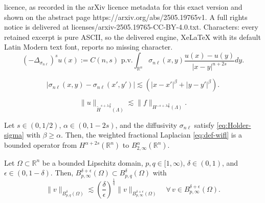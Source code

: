 \documentclass[10pt,a4paper]{amsart}
\def\R{{\mathbb R}}
\def\rn{{{\mathbb R}^n}}
\newcommand{\domain}{\Lambda}
\newcommand{\snl}{{\sigma_{n\ell}}}
\begin{document}
licence, as recorded in the arXiv licence metadata for this exact version and shown on the abstract page https://arxiv.org/abs/2505.19765v1. A full rights notice is delivered at licenses/arxiv-2505.19765-CC-BY-4.0.txt. Characters: every retained excerpt is pure ASCII, so the delivered engine, XeLaTeX with its default Latin Modern text font, reports no missing character.
\begin{equation}\label{eq:def-wifl}
(-\Delta_\snl)^s u (x) := C(n,s) \mbox{ p.v.}\int_{\rn} \snl(x,y)\frac{u(x)-u(y)}{|x-y|^{n+2s}} dy.
\end{equation}

\begin{equation} \label{eq:Holder-sigma}
| \snl(x,y) - \snl(x',y') | \lesssim \left(|x-x'|^\beta + |y-y'|^\beta \right).
\end{equation}

\begin{equation}\label{eq:sob-regularity-intermediate}
  \| u \|_{\widetilde{H}^{s+ \lambda \frac\beta{2}}(\domain)} \lesssim  \| f \|_{H^{-s+\lambda \frac\beta{2}}(\domain)}.
\end{equation}

\begin{lemma}\label{lemma:mapping-Laplacian}
Let $s \in (0,1/2)$, $\alpha \in (0, 1-2s)$, and the diffusivity $\snl$ satisfy \eqref{eq:Holder-sigma} with $\beta \ge \alpha$. Then, the weighted fractional Laplacian \eqref{eq:def-wifl} is a bounded operator from $H^{\alpha+2s} (\R^n)$ to $B^{\alpha}_{2,\infty}(\R^n).$
\end{lemma}

\begin{proposition}
Let $\Omega \subset \R^n$ be a bounded Lipschitz domain, $p,q \in [1,\infty)$, $\delta\in (0,1)$, and $\epsilon \in (0,1-\delta)$. Then, $B^{\delta+\epsilon}_{p,\infty}(\Omega) \subset B^{\delta}_{p,q} (\Omega)$ with 
\begin{equation}\label{eq:Besov-Sobolev-emb}
\|v\|_{ B^{\delta}_{p,q}(\Omega)} \lesssim 
\left( \frac{\delta}{\epsilon} \right)^{\frac1q} \|v\|_{B^{\delta+\epsilon}_{p,\infty}(\Omega)}  \quad\forall \, v\in B^{\delta+\epsilon}_{p,\infty}(\Omega).
\end{equation}
\end{proposition}
\end{document}
